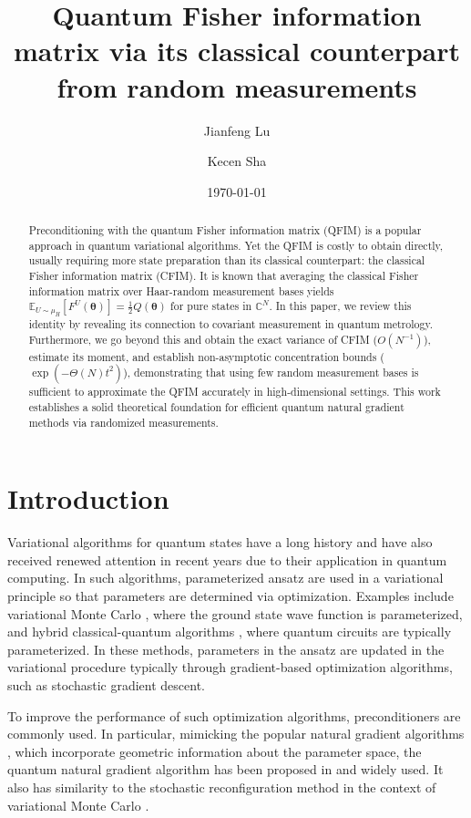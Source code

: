 \documentclass{amsart}
\title{Quantum Fisher information matrix via its classical counterpart from random measurements}
\author{Jianfeng Lu}
\author{Kecen Sha}
\date{\today}
\theoremstyle{plain}
\theoremstyle{definition}
\theoremstyle{remark}
\begin{document}
\begin{abstract}
Preconditioning with the quantum Fisher information matrix (QFIM) is a popular approach in quantum variational algorithms. Yet the QFIM is costly to obtain directly, usually requiring more state preparation than its classical counterpart: the classical Fisher information matrix (CFIM). It is known that averaging the classical Fisher information matrix over Haar-random measurement bases yields $\mathbb{E}_{U\sim\mu_H}[F^U(\boldsymbol{\theta})] = \frac{1}{2}Q(\boldsymbol{\theta})$ for pure states in $\mathbb{C}^N$. In this paper, we review this identity by revealing its connection to covariant measurement in quantum metrology. Furthermore, we go beyond this and obtain the exact variance of CFIM ($O(N^{-1})$), estimate its moment, and establish non-asymptotic concentration bounds ($\exp(-\Theta(N)t^2)$), demonstrating that using few random measurement bases is sufficient to approximate the QFIM accurately in high-dimensional settings.  This work establishes a solid theoretical foundation for efficient quantum natural gradient methods via randomized measurements. 
\end{abstract}
\maketitle

\section{Introduction}

Variational algorithms for quantum states have a long history and have also received renewed attention in recent years due to their application in quantum computing. In such algorithms, parameterized ansatz are used in a variational principle so that parameters are determined via optimization. Examples include variational Monte Carlo \cites{foulkes2001quantum, sorella2005wave, toulouse2016introduction}, where the ground state wave function is parameterized, and hybrid classical-quantum algorithms \cite{cerezo2021variational}, where quantum circuits are typically parameterized. In these methods, parameters in the ansatz are updated in the variational procedure typically through gradient-based optimization algorithms, such as stochastic gradient descent. 

To improve the performance of such optimization algorithms, preconditioners are commonly used. In particular, mimicking the popular natural gradient algorithms \cites{amari1998natural, amari2016information}, which incorporate geometric information about the parameter space, the quantum natural gradient algorithm has been proposed in \cite{stokes2020quantum} and widely used. It also has similarity to the stochastic reconfiguration method in the context of variational Monte Carlo \cites{sorella1998green, sorella2007weak}.  
\end{document}
